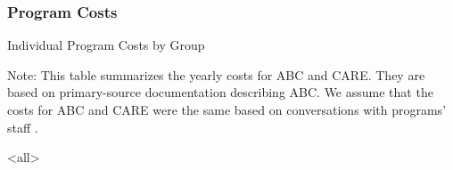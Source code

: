\documentclass[static]{JJH-Beamer}
\newcommand{\backupend}{
   \setcounter{framenumber}{\value{finalframe}}
}
\begin{document}

\begin{frame}

\frametitle{Program Costs}



\begin{table}

\begin{center}

\caption{Individual Program Costs by Group}

\scalebox{.5}{
}

\end{center}

\end{table}

{\tiny\flushleft Note: This table summarizes the yearly costs for ABC and CARE. They are based on primary-source documentation describing ABC. We assume that the costs for ABC and CARE were the same based on conversations with programs' staff \citet{projectcare2014interviews,abc2014-2015interviews}.}

\hyperlink{costs}{}		

\end{frame}
\backupend



\mode<all>

\savebox\hiddenbib{\parbox{\textwidth}{}}
\end{document}

